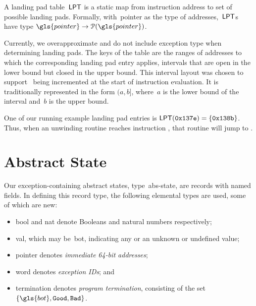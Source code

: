 \begin{definition}
  A landing pad table~$\operatorname{\mathsf{LPT}}$ is a static map from instruction address to set of possible landing pads.
  Formally, with~\gls{pointer} as the type of addresses,~$\operatorname{\mathsf{LPT}}$s have type $\gls{pointer}\to\powerset(\gls{pointer})$.
\end{definition}
Currently, we overapproximate and do not include exception type when determining landing pads.
The keys of the table are the ranges of addresses to which the corresponding landing pad entry applies, intervals that are open in the lower bound but closed in the upper bound. This interval layout was chosen to support \rip\ being incremented at the start of instruction evaluation. It is traditionally represented in the form $(a,b]$, where~$a$ is the lower bound of the interval and~$b$ is the upper bound.
\begin{example}\label{ex:landing-pad-table}
  One of our running example landing pad entries is  $\operatorname{\mathsf{LPT}}(\mathtt{0x137e})=\{\mathtt{0x138b}\}$.
  Thus, when an unwinding routine reaches instruction , %
  that routine will jump to .
\end{example}

\section{Abstract State}\label{sec:abstract-state}
Our exception-containing abstract states, type~\gls{abs-state}, are records with named fields.
In defining this record type, the following elemental types are used, some of which are new:
\begin{itemize} %
  \item \Gls{bool} and \gls{nat} denote Booleans and natural numbers respectively;
  \item \Gls{val},
  which may be~\gls{bot}, indicating any or an unknown or undefined value;
  \item \Gls{pointer} denotes \emph{immediate 64-bit addresses};
  \item \Gls{word} denotes \emph{exception IDs}; and
  \item \Gls{termination} denotes \emph{program termination}, consisting of the set $\{\gls{bot},\good,\bad\}$.
\end{itemize}

